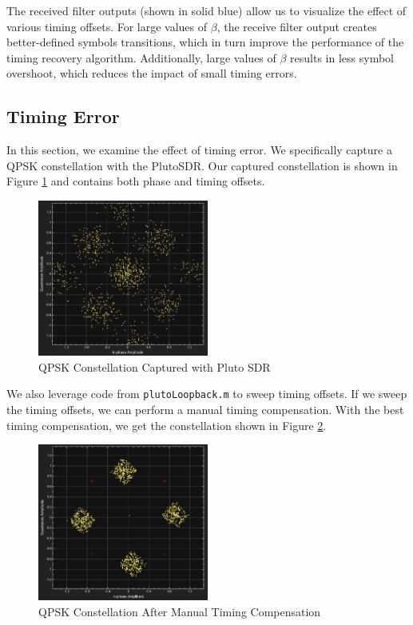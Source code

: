 \documentclass{article}
\begin{document}
\noindent The received filter outputs (shown in solid blue) allow us to visualize the effect of various timing offsets. For large values of $\beta$, the receive filter output creates better-defined symbols transitions, which in turn improve the performance of the timing recovery algorithm. Additionally, large values of $\beta$ results in less symbol overshoot, which reduces the impact of small timing errors.

\subsection{Timing Error}

In this section, we examine the effect of timing error. We specifically capture a QPSK constellation with the PlutoSDR. Our captured constellation is shown in Figure \ref{fig::pluto_constellation_raw} and contains both phase and timing offsets.

\begin{figure}[H]
	\centerline{\includegraphics[width=0.5\textwidth]{pluto_constellation_raw.png}}
	\caption{QPSK Constellation Captured with Pluto SDR}
	\label{fig::pluto_constellation_raw}
\end{figure}

\noindent We also leverage code from \texttt{plutoLoopback.m} to sweep timing offsets. If we sweep the timing offsets, we can perform a manual timing compensation. With the best timing compensation, we get the constellation shown in Figure \ref{fig::pluto_constellation_best}.

\begin{figure}[H]
	\centerline{\includegraphics[width=0.5\textwidth]{pluto_constellation_best.png}}
	\caption{QPSK Constellation After Manual Timing Compensation}
	\label{fig::pluto_constellation_best}
\end{figure}
\end{document}
